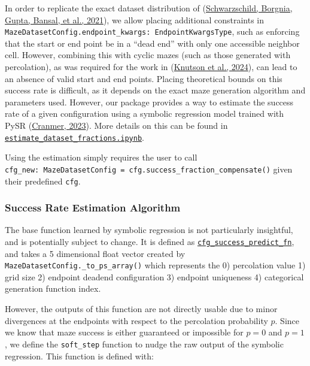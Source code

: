 \documentclass[10pt,a4paper,onecolumn]{article}
\begin{document}
In order to replicate the exact dataset distribution of
(\protect\hyperlink{ref-easy_to_hard}{Schwarzschild, Borgnia, Gupta,
Bansal, et al., 2021}), we allow placing additional constraints in
\texttt{MazeDatasetConfig.endpoint\_kwargs:\ EndpointKwargsType}, such
as enforcing that the start or end point be in a ``dead end'' with only
one accessible neighbor cell. However, combining this with cyclic mazes
(such as those generated with percolation), as was required for the work
in (\protect\hyperlink{ref-knutson2024logicalextrapolation}{Knutson et
al., 2024}), can lead to an absence of valid start and end points.
Placing theoretical bounds on this success rate is difficult, as it
depends on the exact maze generation algorithm and parameters used.
However, our package provides a way to estimate the success rate of a
given configuration using a symbolic regression model trained with PySR
(\protect\hyperlink{ref-pysr}{Cranmer, 2023}). More details on this can
be found in
\href{https://understanding-search.github.io/maze-dataset/notebooks/estimate_dataset_fractions.html}{\texttt{estimate\_dataset\_fractions.ipynb}}.

Using the estimation simply requires the user to call
\texttt{cfg\_new:\ MazeDatasetConfig\ =\ cfg.success\_fraction\_compensate()}
given their predefined \texttt{cfg}.

\hypertarget{success-rate-estimation-algorithm}{%
\subsubsection{Success Rate Estimation
Algorithm}\label{success-rate-estimation-algorithm}}

The base function learned by symbolic regression is not particularly
insightful, and is potentially subject to change. It is defined as
\href{https://understanding-search.github.io/maze-dataset/maze_dataset/dataset/success_predict_math.html\#cfg_success_predict_fn}{\texttt{cfg\_success\_predict\_fn}},
and takes a 5 dimensional float vector created by
\texttt{MazeDatasetConfig.\_to\_ps\_array()} which represents the 0)
percolation value 1) grid size 2) endpoint deadend configuration 3)
endpoint uniqueness 4) categorical generation function index.

However, the outputs of this function are not directly usable due to
minor divergences at the endpoints with respect to the percolation
probability \(p\). Since we know that maze success is either guaranteed
or impossible for \(p=0\) and \(p=1\), we define the \texttt{soft\_step}
function to nudge the raw output of the symbolic regression. This
function is defined with:
\end{document}
